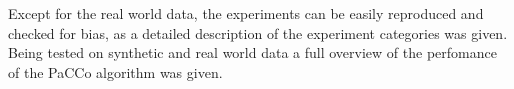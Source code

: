 \documentclass[12pt,journal,compsoc]{IEEEtran}
\numberwithin{equation}{section}
\begin{document}
Except for the real world data, the experiments can be easily reproduced and checked for bias, as a detailed description of the experiment categories was given. Being tested on synthetic and real world data a full overview of the perfomance of the PaCCo algorithm was given. 



%
%



%
%
\end{document}

